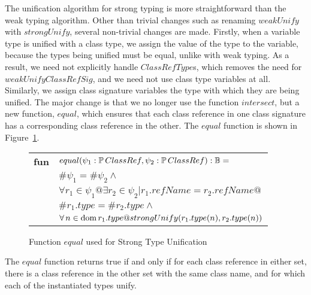 The unification algorithm for strong typing is more straightforward
than the weak typing algorithm. Other than trivial changes such as
renaming $weakUnify$ with $strongUnify$, several non-trivial changes
are made. Firstly, when a variable type is unified with a class type,
we assign the value of the type to the variable, because the types
being unified must be equal, unlike with weak typing. As a result, we
need not explicitly handle $ClassRefType$s, which removes the need for
$weakUnifyClassRefSig$, and we need not use class type variables at
all. Similarly, we assign class signature variables the type with
which they are being unified. The major change is that we no longer
use the function $intersect$, but a new function, $equal$, which
ensures that each class reference in one class signature has a
corresponding class reference in the other. The $equal$ function is
shown in Figure~\ref{equal-classref}.

\begin{figure}[t]
\begin{tabular}{ll}
  {\bf fun} & $equal(\psi_1:\power ClassRef, \psi_2:\power ClassRef) : \bool =$\\
   & \quad\quad$\#\psi_1 = \#\psi_2 \land$\\
   & \quad\quad$\forall r_1 \in \psi_1 @ \exists r_2 \in \psi_2 | r_1.refName = r_2.refName @$\\
   & \quad\quad\quad\quad $\#r_1.type = \#r_2.type \land$\\
   & \quad\quad\quad\quad $\forall n \in \dom r_1.type @
       strongUnify(r_1.type(n), r_2.type(n))$
\end{tabular}
\caption{Function $equal$ used for Strong Type Unification}
\label{equal-classref}
\end{figure}

The $equal$ function returns true if and only if for each class
reference in either set, there is a class reference in the other set
with the same class name, and for which each of the instantiated types
unify.

